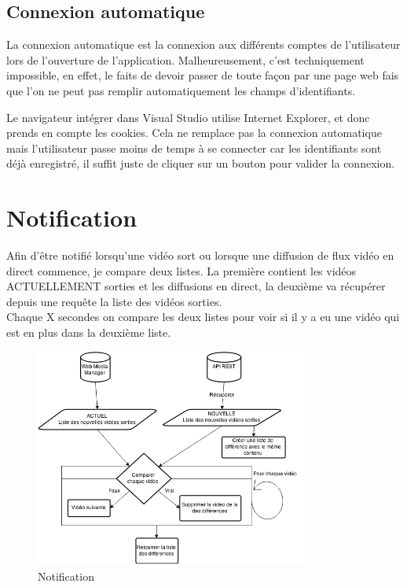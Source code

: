\documentclass[11pt]{report} %
\begin{document}
	\subsection{Connexion automatique}
	La connexion automatique est la connexion aux différents comptes de l'utilisateur lors de l'ouverture de l'application. Malheureusement, c'est techniquement impossible, en effet, le faits de devoir passer de toute façon par une page web fais que l'on ne peut pas remplir automatiquement les champs d'identifiants.
	
	Le navigateur intégrer dans Visual Studio utilise Internet Explorer, et donc prends en compte les cookies. Cela ne remplace pas la connexion automatique mais l'utilisateur passe moins de temps à se connecter car les identifiants sont déjà enregistré, il suffit juste de cliquer sur un bouton pour valider la connexion.

	\newpage
	
	\section{Notification}
	
	Afin d'être notifié lorsqu'une vidéo sort ou lorsque une diffusion de flux vidéo en direct commence, je compare deux listes. La première contient les vidéos ACTUELLEMENT sorties et les diffusions en direct, la deuxième va récupérer depuis une requête la liste des vidéos sorties. \\
	Chaque X secondes on compare les deux listes pour voir si il y a eu une vidéo qui est en plus dans la deuxième liste.
	
	\begin{figure}[h]
		\center
		\includegraphics[width=0.8\textwidth]{../img/notification.png}
		\caption{Notification}
		\label{checkNotif}
	\end{figure}
	
\end{document}
